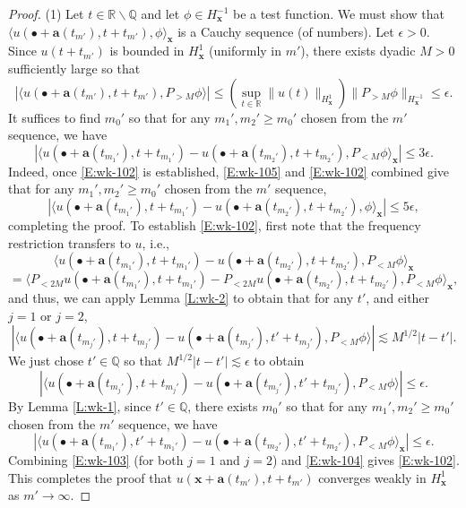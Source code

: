 \documentclass[12pt,letterpaper]{amsart}
\newcommand{\la}{\langle}
\newcommand{\ra}{\rangle}
\theoremstyle{remark}
\numberwithin{equation}{section}
\numberwithin{theorem}{section}
\numberwithin{table}{section}
\begin{document}
\begin{proof}
(1) Let $t\in \mathbb{R}\backslash \mathbb{Q}$ and let $\phi \in H^{-1}_{\mathbf{x}}$ be a test function. We must show that  $\la u(\bullet+\mathbf{a}(t_{m'}), t+ t_{m'}), \phi \ra_{\mathbf{x}}$ is a Cauchy sequence (of numbers).  Let $\epsilon>0$.  Since $u(t+t_{m'})$ is bounded in $H^1_{\mathbf{x}}$ (uniformly in $m'$), there exists dyadic $M>0$ sufficiently large so that 
\begin{equation}
\label{E:wk-105}
| \la u(\bullet+\mathbf{a}(t_{m'}),t+t_{m'}), P_{>M} \phi \ra | \leq ( \sup_{t\in \mathbb{R}} \|u(t) \|_{H_{\mathbf{x}}^1} ) \| P_{>M} \phi \|_{H^{-1}_{\mathbf{x}}} \leq \epsilon.
\end{equation}
It suffices to find $m_0'$ so that for any $m_1', m_2' \geq m_0'$ chosen from the $m'$ sequence, we have
\begin{equation}
\label{E:wk-102}
| \la u(\bullet+\mathbf{a}(t_{m_1'}), t+t_{m_1'}) - u(\bullet+\mathbf{a}(t_{m_2'}), t+t_{m_2'}) , P_{<M} \phi \ra_{\mathbf{x}} | \leq 3\epsilon.
\end{equation}
Indeed, once \eqref{E:wk-102} is established, \eqref{E:wk-105} and \eqref{E:wk-102} combined give  that for any $m_1', m_2' \geq m_0'$ chosen from the $m'$ sequence,
$$
| \la u(\bullet+\mathbf{a}(t_{m_1'}), t+t_{m_1'}) - u(\bullet+\mathbf{a}(t_{m_2'}),t+t_{m_2'}) , \phi \ra_{\mathbf{x}} | \leq 5\epsilon,
$$
completing the proof.  To establish \eqref{E:wk-102}, first note that the frequency restriction transfers to $u$, i.e.,
$$ 
\la u(\bullet+\mathbf{a}(t_{m_1'}), t+t_{m_1'}) - u(\bullet+\mathbf{a}(t_{m_2'}), t+t_{m_2'}) , P_{<M} \phi \ra_{\mathbf{x}}  
$$
$$
= \la  P_{<2M} u(\bullet+\mathbf{a}(t_{m_1'}), t+t_{m_1'}) - P_{<2M} u(\bullet+\mathbf{a}(t_{m_2'}), t+t_{m_2'}) , P_{<M} \phi \ra_{\mathbf{x}},
$$
and thus, we can apply Lemma \ref{L:wk-2} to obtain that for any $t'$, and either $j=1$ or $j=2$,
$$
|\la u(\bullet+\mathbf{a}(t_{m_j'}), t+t_{m_j'}) -  u(\bullet+\mathbf{a}(t_{m_j'}),t'+t_{m_j'}), P_{<M} \phi \ra | \lesssim M^{1/2} |t-t'|.
$$
We just chose $t'\in \mathbb{Q}$  so that $M^{1/2}|t-t'| \lesssim  \epsilon$ to obtain 
\begin{equation}
\label{E:wk-103}
|\la u(\bullet+\mathbf{a}(t_{m_j'}),t+t_{m_j'}) -  u(\bullet+\mathbf{a}(t_{m_j'}),t'+t_{m_j'}), P_{<M} \phi \ra | \leq \epsilon.
\end{equation}
By Lemma \ref{L:wk-1}, since $t'\in \mathbb{Q}$, there exists $m_0'$ so that for any $m_1', m_2' \geq m_0'$ chosen from the $m'$ sequence, we have
\begin{equation}
\label{E:wk-104}
| \la u(\bullet+\mathbf{a}(t_{m_1'}),t'+t_{m_1'}) - u(\bullet+\mathbf{a}(t_{m_2'}),t'+t_{m_2'}) , P_{<M} \phi \ra_{\mathbf{x}} | \leq \epsilon.
\end{equation}
Combining \eqref{E:wk-103} (for both $j=1$ and $j=2$) and \eqref{E:wk-104} gives \eqref{E:wk-102}.  This completes the proof that  $u(\mathbf{x}+\mathbf{a}(t_{m'}),t+t_{m'})$ converges weakly in $H_{\mathbf{x}}^1$ as $m'\to\infty$.  


\end{proof}
\end{document}
